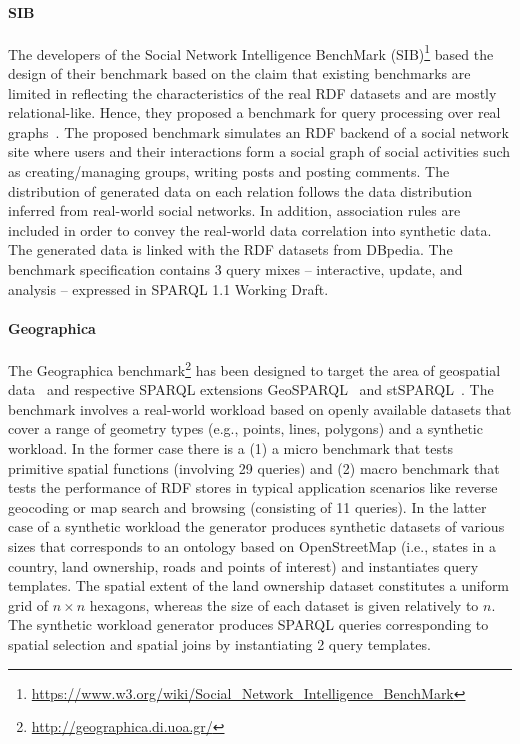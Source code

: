 \paragraph{SIB} The developers of the Social Network Intelligence BenchMark (SIB)\footnote{\url{https://www.w3.org/wiki/Social_Network_Intelligence_BenchMark}} based the design of their benchmark based on the claim that existing benchmarks are limited in reflecting the characteristics of the real RDF datasets and are mostly relational-like. Hence, they proposed a benchmark for  query processing over real graphs~\cite{sib}. The proposed benchmark simulates an RDF backend of a social network site where users and their interactions form a social graph of social activities such as creating/managing groups, writing posts and posting comments. The distribution of generated data on each relation follows the data distribution inferred from real-world social networks. In addition, association rules are included in order to convey the real-world data correlation into synthetic data. The  generated data is linked with the RDF datasets from DBpedia. The benchmark specification contains 3 query mixes -- interactive, update, and analysis -- expressed in SPARQL 1.1 Working Draft.

\paragraph{Geographica} The Geographica benchmark\footnote{\url{http://geographica.di.uoa.gr/}} has been designed to target the area of geospatial data~\cite{DBLP:conf/semweb/GarbisKK13} and respective SPARQL extensions GeoSPARQL~\cite{battle2012enabling} and stSPARQL~\cite{koubarakis2010modeling}. The benchmark involves a real-world workload based on openly available datasets that cover a range of geometry types (e.g., points, lines, polygons) and  a synthetic workload. In the former case there is a (1) a micro benchmark that tests primitive spatial functions (involving 29 queries) and (2) macro benchmark that tests the performance of RDF stores in typical application scenarios like reverse geocoding or map search and browsing (consisting of 11 queries). In the latter case of a synthetic workload the generator produces synthetic datasets of various sizes that corresponds to an ontology based on OpenStreetMap (i.e., states in a country, land ownership, roads and  points of interest) and instantiates query templates. The spatial extent of the land ownership dataset constitutes a uniform grid of $n \times n$ hexagons, whereas the size of each dataset is given relatively to $n$. The synthetic workload generator produces SPARQL queries corresponding to spatial selection and spatial joins by instantiating 2 query templates.


